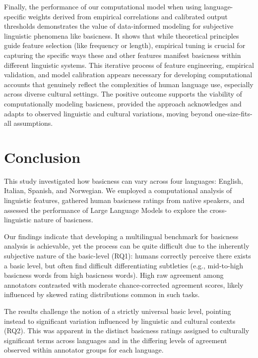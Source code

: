 \documentclass[preprint,12pt,authoryear]{elsarticle}
\begin{document}
Finally, the performance of our computational model when using language-specific weights derived from empirical correlations and calibrated output thresholds demonstrates the value of data-informed modeling for subjective linguistic phenomena like basicness. It shows that while theoretical principles guide feature selection (like frequency or length), empirical tuning is crucial for capturing the specific ways these and other features manifest basicness within different linguistic systems. This iterative process of feature engineering, empirical validation, and model calibration appears necessary for developing computational accounts that genuinely reflect the complexities of human language use, especially across diverse cultural settings. The positive outcome supports the viability of computationally modeling basicness, provided the approach acknowledges and adapts to observed linguistic and cultural variations, moving beyond one-size-fits-all assumptions.

\section{Conclusion}
\label{sec:conclusion}

This study investigated how basicness can vary across four languages: English, Italian, Spanish, and Norwegian. We employed a computational analysis of linguistic features, gathered human basicness ratings from native speakers, and assessed the performance of Large Language Models to explore the cross-linguistic nature of basicness.

Our findings indicate that developing a multilingual benchmark for basicness analysis is achievable, yet the process can be quite difficult due to the inherently subjective nature of the basic-level (RQ1): humans correctly perceive there exists a basic level, but often find difficult differentiating subtleties (e.g., mid-to-high basicness words from high basicness words). High raw agreement among annotators contrasted with moderate chance-corrected agreement scores, likely influenced by skewed rating distributions common in such tasks.

The results challenge the notion of a strictly universal basic level, pointing instead to significant variation influenced by linguistic and cultural contexts (RQ2). This was apparent in the distinct basicness ratings assigned to culturally significant terms across languages and in the differing levels of agreement observed within annotator groups for each language.
\end{document}
